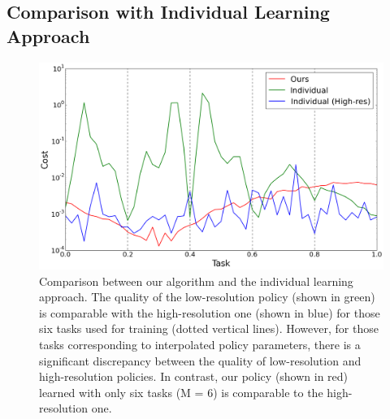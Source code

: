 \subsection{Comparison with Individual Learning Approach}
\begin{figure}[ht]
\center
  \includegraphics[width=4.5in]{images/plot_vs_ind}
  \caption{Comparison between our algorithm and the individual
    learning approach. The quality of the low-resolution policy
    (shown in green) is comparable with the high-resolution one (shown
    in blue) for those six tasks used for training (dotted vertical
    lines). However, for those tasks corresponding to interpolated
    policy parameters, there is a significant discrepancy between the
    quality of low-resolution and high-resolution policies. In
    contrast, our policy (shown in red) learned with only six tasks (M
    = 6) is comparable to the high-resolution one.}


  \label{fig:optskills_vs_ind}
\end{figure}

